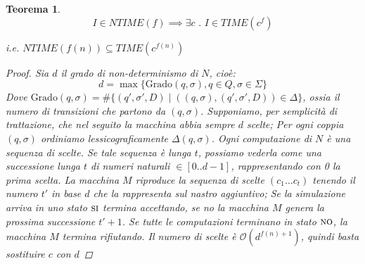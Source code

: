 \documentclass[a4paper,10pt,oneside]{article}
\theoremstyle{break}
\newtheorem{teo}{Teorema}[subsection]
\newcommand{\SI}{\textsc{si}}
\newcommand{\NO}{\textsc{no}}
\newcommand{\bigo}{\mathcal O}
\begin{document}
\begin{mdframed}
 \begin{teo}
  \[I \in NTIME(f) \implies \exists c \,\,.\,\, I \in TIME(c^f)\]

  i.e. $NTIME(f(n)) \subseteq TIME(c^{f(n)})$

  \dotfill

  \begin{proof}
   Sia $d$ il grado di non-determinismo di $N$, cioè:
   \[ d = \max\{ \text{Grado}(q, \sigma), q \in Q, \sigma \in \Sigma \} \]
   Dove $\text{Grado}(q, \sigma) = \# \{ (q', \sigma', D) \mid ((q, \sigma), (q', \sigma', D)) \in \Delta \}$, ossia il numero di transizioni che partono da $(q, \sigma)$. Supponiamo, per semplicità di trattazione, che nel seguito la macchina abbia sempre $d$ scelte;
   Per ogni coppia $(q, \sigma)$ ordiniamo lessicograficamente $\Delta(q, \sigma)$. Ogni computazione di $N$ è una sequenza di scelte. Se tale sequenza è lunga $t$, possiamo vederla come una successione lunga $t$ di numeri naturali $\in [0.. d-1]$, rappresentando con 0 la prima scelta. La macchina $M$ riproduce la sequenza di scelte $(c_1 \hdots c_t)$ tenendo il numero $t'$ in base $d$ che la rappresenta sul nastro aggiuntivo; Se la simulazione arriva in uno stato $\SI$ termina accettando, se no la macchina $M$ genera la prossima successione $t' + 1$. Se tutte le computazioni terminano in stato $\NO$, la macchina $M$ termina rifiutando. Il numero di scelte è $\bigo(d^{f(n) + 1})$, quindi basta sostituire $c$ con $d$
  \end{proof}
 \end{teo}
\end{mdframed}
\newpage
\end{document}

